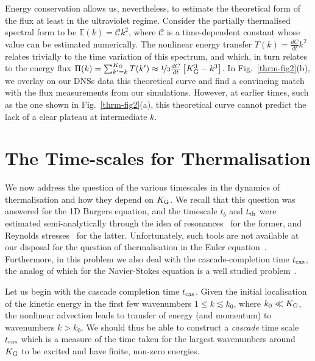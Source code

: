 \documentclass[../Rajarshi-thesis-draft.tex]{subfiles}
\begin{document}
Energy conservation allows us, nevertheless, to estimate the theoretical form
of the flux at least in the ultraviolet regime. Consider the partially
thermalised spectral form to be $\mathbb{E}(k) = \mathcal{C} k^2$, where $\mathcal{C}$ is a time-dependent
constant whose value can be estimated numerically. The nonlinear energy
transfer $T (k) = \frac{dC}{dt}k^2$ relates trivially to the time variation of
this spectrum, and which, in turn relates to the energy flux $\Pi (k) =
\sum_{k^\prime = k}^{K_{\rm G}}  T(k')\approx \nicefrac{1}{3}\frac{dC}{dt}\left [
	K_{\rm G}^3 - k^3\right ]$. In Fig.~\ref{thrm-fig2}(b), we overlay on
our DNSs data this theoretical curve
and find a convincing match with the flux
measurements from our simulations. However, at earlier times, such as the one shown in
Fig.~\ref{thrm-fig2}(a), this theoretical curve cannot predict the lack of a clear plateau at intermediate $k$.

\section{The Time-scales for Thermalisation}

We now address the question of the various timescales in the dynamics of
thermalisation and how they depend on $K_{\rm G}$. We recall that this question
was answered for the 1D Burgers equation, and the timescale $t_b$ and $t_{\rm
th}$ were estimated semi-analytically through the idea of
resonances~\cite{RayetalTygers2011} for the former, and Reynolds
stresses~\cite{VenkataramanRay} for the latter. Unfortunately, such tools are
not available at our disposal for the question of thermalisation in the Euler
equation~\cite{MuruganRay2023}. Furthermore, in this problem we also deal with
the cascade-completion time $t_{\rm cas}$, the analog of which for the Navier-Stokes
equation is a well studied
problem~\cite{Brachetetal1983,HerringKerr1993,RayetalEPJB}.

Let us begin with the cascade completion time $t_{\rm cas}$.  Given the initial
localisation of the kinetic energy in the first few wavenumbers $1 \leq k
\lesssim k_0$, where $k_0 \ll K_{\rm G}$, the nonlinear advection leads to
transfer of energy (and momentum) to wavenumbers $k > k_0$. We should thus be
able to construct a \textit{cascade} time scale $t_{\rm cas}$ which is a measure of the
time taken for the largest wavenumbers around $K_{\rm G}$ to be excited and
have finite, non-zero energies.
\end{document}
